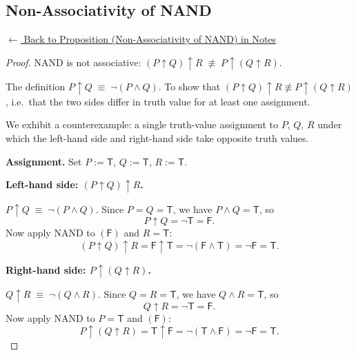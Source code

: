 
\subsection*{Non-Associativity of NAND}
\label{prf:nand-non-associativity}

\begin{remark*}[Return]
\hyperref[prop:nand-complete]{$\leftarrow$ Back to Proposition (Non-Associativity of NAND) in Notes}
\end{remark*}

\begin{proof}
\Claim NAND is not associative: $(P \uparrow Q) \uparrow R \;\not\equiv\; P \uparrow (Q \uparrow R)$.

\Given The definition $P \uparrow Q \;\equiv\; \neg(P \wedge Q)$.
\Goal To show that $(P \uparrow Q) \uparrow R \not\equiv P \uparrow (Q \uparrow R)$,
i.e.\ that the two sides differ in truth value for at least one assignment.

\Strategy We exhibit a counterexample: a single truth-value assignment to $P$, $Q$, $R$
under which the left-hand side and right-hand side take opposite truth values.

\medskip
\textbf{Assignment.} Set $P := \mathsf{T}$, $Q := \mathsf{T}$, $R := \mathsf{T}$.

\medskip
\textbf{Left-hand side: $(P \uparrow Q) \uparrow R$.}

\ByDef $P \uparrow Q \;\equiv\; \neg(P \wedge Q)$.
Since $P = Q = \mathsf{T}$, we have $P \wedge Q = \mathsf{T}$, so
\[
    P \uparrow Q = \neg\mathsf{T} = \mathsf{F}.
\]
Now apply NAND to $(\mathsf{F})$ and $R = \mathsf{T}$:
\[
    (P \uparrow Q) \uparrow R = \mathsf{F} \uparrow \mathsf{T}
    = \neg(\mathsf{F} \wedge \mathsf{T}) = \neg\mathsf{F} = \mathsf{T}.
\]

\medskip
\textbf{Right-hand side: $P \uparrow (Q \uparrow R)$.}

\ByDef $Q \uparrow R \;\equiv\; \neg(Q \wedge R)$.
Since $Q = R = \mathsf{T}$, we have $Q \wedge R = \mathsf{T}$, so
\[
    Q \uparrow R = \neg\mathsf{T} = \mathsf{F}.
\]
Now apply NAND to $P = \mathsf{T}$ and $(\mathsf{F})$:
\[
    P \uparrow (Q \uparrow R) = \mathsf{T} \uparrow \mathsf{F}
    = \neg(\mathsf{T} \wedge \mathsf{F}) = \neg\mathsf{F} = \mathsf{T}.
\]


\end{proof}
